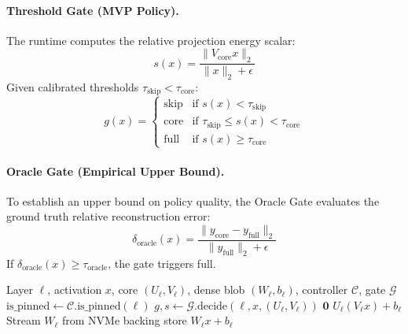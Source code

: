 \documentclass[11pt,a4paper]{article}
\begin{document}
\paragraph{Threshold Gate (MVP Policy).}
The runtime computes the relative projection energy scalar:
\begin{equation}
    s(x) = \frac{\|V_{\text{core}} x\|_2}{\|x\|_2 + \epsilon}
\end{equation}
Given calibrated thresholds $\tau_{\text{skip}} < \tau_{\text{core}}$:
\begin{equation}
    g(x) = \begin{cases}
    \text{skip} & \text{if } s(x) < \tau_{\text{skip}} \\
    \text{core} & \text{if } \tau_{\text{skip}} \le s(x) < \tau_{\text{core}} \\
    \text{full} & \text{if } s(x) \ge \tau_{\text{core}}
    \end{cases}
\end{equation}

\paragraph{Oracle Gate (Empirical Upper Bound).}
To establish an upper bound on policy quality, the Oracle Gate evaluates the ground truth relative reconstruction error:
\begin{equation}
    \delta_{\text{oracle}}(x) = \frac{\|y_{\text{core}} - y_{\text{full}}\|_2}{\|y_{\text{full}}\|_2 + \epsilon}
\end{equation}
If $\delta_{\text{oracle}}(x) \ge \tau_{\text{oracle}}$, the gate triggers full.

\begin{algorithm}[t]
\caption{WARI-L Sublayer Adaptive Dispatch}
\label{alg:dispatch}
\begin{algorithmic}[1]
\Require Layer $\ell$, activation $x$, core $(U_\ell, V_\ell)$, dense blob $(W_\ell, b_\ell)$, controller $\mathcal{C}$, gate $\mathcal{G}$
\State $\text{is\_pinned} \gets \mathcal{C}.\text{is\_pinned}(\ell)$
\State $g, s \gets \mathcal{G}.\text{decide}(\ell, x, (U_\ell, V_\ell))$
    \State \Return $\mathbf{0}$
    \State \Return $U_\ell(V_\ell x) + b_\ell$ 
        \State Stream $W_\ell$ from NVMe backing store
    \EndIf
    \State \Return $W_\ell x + b_\ell$ 
\EndIf
\end{algorithmic}
\end{algorithm}
\end{document}
